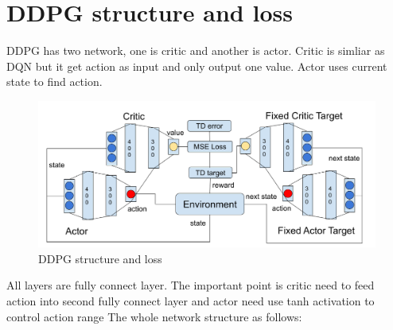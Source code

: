 \documentclass[12pt]{article}
\begin{document}
\section{DDPG structure and loss}

DDPG has two network, one is critic and another is actor. Critic is simliar as DQN but it get action as input and only output one value. Actor uses current state to find action.

\begin{figure}[H]
\centering
\includegraphics[width=\linewidth]{Images/ddpg-arch2.png} 
\caption{DDPG structure and loss}
\end{figure}

All layers are fully connect layer. The important point is critic need to feed action into second fully connect layer and actor need use tanh activation to control action range The whole network structure as follows:
\end{document}
